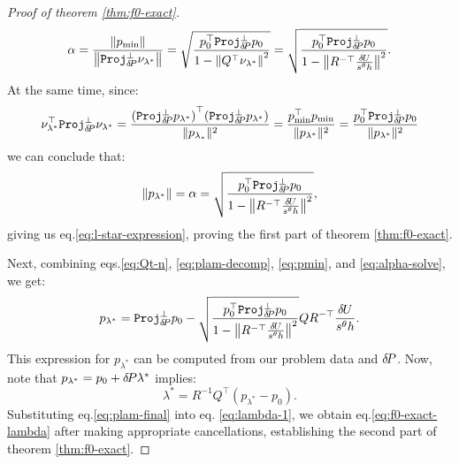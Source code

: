 \documentclass[smallcondensed]{svjour3}
\begin{document}
\begin{proof}[Proof of theorem \ref{thm:f0-exact}]
\begin{equation}
    \alpha = \frac{\left\|p_{\operatorname{min}}\right\|}{\left\|\mathtt{Proj}^\perp_{{\delta \hspace{-0.14em} P}} \nu_{\lambda^*}\right\|} = \sqrt{\frac{p_0^\top \mathtt{Proj}^\perp_{{\delta \hspace{-0.14em} P}} p_0}{1 - \left\|Q^\top \nu_{\lambda^*}\right\|^2}} = \sqrt{\frac{p_0^\top \mathtt{Proj}^\perp_{{\delta \hspace{-0.14em} P}} p_0}{1 - \left\|R^{-\top} \frac{{\delta \hspace{-0.09em} U}}{s^\theta h}\right\|^2}}.
  \end{equation}
  At the same time, since:
  \begin{equation}
    \nu_{\lambda^*}^\top \mathtt{Proj}^\perp_{{\delta \hspace{-0.14em} P}} \nu_{\lambda^*} = \frac{{(\mathtt{Proj}^\perp_{{\delta \hspace{-0.14em} P}} p_{\lambda^*})}^\top {(\mathtt{Proj}^\perp_{{\delta \hspace{-0.14em} P}} p_{\lambda^*})}}{\|p_{\lambda_*}\|^2} = \frac{p_{\operatorname{min}}^\top p_{\operatorname{min}}}{\|p_{\lambda^*}\|^2} = \frac{p_0^\top \mathtt{Proj}^\perp_{{\delta \hspace{-0.14em} P}} p_0}{\|p_{\lambda^*}\|^2}
  \end{equation}
  we can conclude that:
  \begin{equation}
    \|p_{\lambda^*}\| = \alpha = \sqrt{\frac{p_0^\top \mathtt{Proj}^\perp_{{\delta \hspace{-0.14em} P}} p_0}{1 - \left\|R^{-\top} \frac{{\delta \hspace{-0.09em} U}}{s^\theta h}\right\|^2}},
  \end{equation}
  giving us eq.\@ \ref{eq:l-star-expression}, proving the first
  part of theorem \ref{thm:f0-exact}.

  Next, combining eqs.\@ \ref{eq:Qt-n}, \ref{eq:plam-decomp},
  \ref{eq:pmin}, and \ref{eq:alpha-solve}, we get:
  \begin{equation}\label{eq:plam-final}
    p_{\lambda^*} = \mathtt{Proj}^\perp_{{\delta \hspace{-0.14em} P}} p_0 - \sqrt{\frac{p_0^\top \mathtt{Proj}^\perp_{{\delta \hspace{-0.14em} P}} p_0}{1 - \left\|R^{-\top} \frac{{\delta \hspace{-0.09em} U}}{s^\theta h}\right\|^2}} Q R^{-\top} \frac{{\delta \hspace{-0.09em} U}}{s^\theta h}.
  \end{equation}
  This expression for $p_{\lambda^*}$ can be computed from our problem
  data and ${\delta \hspace{-0.14em} P}$. Now, note that
  $p_{\lambda^*} = p_0 + {\delta \hspace{-0.14em} P} \lambda^*$ implies:
  \begin{equation}\label{eq:lambda-1}
    \lambda^* = R^{-1} Q^\top (p_{\lambda^*} - p_0).
  \end{equation}
  Substituting eq.\@ \ref{eq:plam-final} into eq.\@
  \ref{eq:lambda-1}, we obtain eq.\@ \ref{eq:f0-exact-lambda} after
  making appropriate cancellations, establishing the second part of
  theorem \ref{thm:f0-exact}.


\end{proof}
\end{document}
